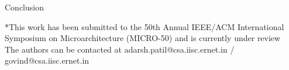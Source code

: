 \documentclass[final,t]{beamer}
\begin{document}
\begin{frame}[t,fragile]{}
\begin{tcolorbox}[colback=red!5!white,
                          colframe=red!75!black,
                         ]
\begin{columns}[t]
\begin{column}{.48\linewidth}
\begin{exampleblock}{Conclusion}
	\end{exampleblock}
	
		\footnotesize{*This work has been submitted to the  50th Annual IEEE/ACM International Symposium on Microarchitecture (MICRO-50) and is currently under review} \\
		\vspace{2em}
		\footnotesize{The authors can be contacted at adarsh.patil@csa.iisc.ernet.in / govind@csa.iisc.ernet.in}
      \end{column}
      \end{columns}
    \end{tcolorbox}

\end{frame}
\end{document}
